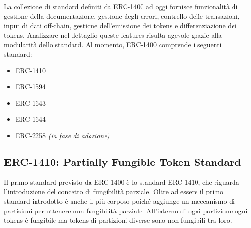 La collezione di standard definiti da ERC-1400 ad oggi fornisce funzionalità di gestione della documentazione, gestione degli errori, controllo delle transazioni, input di dati off-chain, gestione dell'emissione dei tokens e differenziazione dei tokens. 
Analizzare nel dettaglio queste features risulta agevole grazie alla modularità dello standard. Al momento, ERC-1400 comprende i seguenti standard:
\begin{itemize}
    \item ERC-1410
    \item ERC-1594
    \item ERC-1643
    \item ERC-1644
    \item ERC-2258 \textit{(in fase di adozione)}
\end{itemize}

\subsection{ERC-1410: Partially Fungible Token Standard}
Il primo standard previsto da ERC-1400 è lo standard ERC-1410, che riguarda l'introduzione del concetto di fungibilità parziale. Oltre ad essere il primo standard introdotto è anche il più corposo poiché aggiunge un meccanismo di partizioni per ottenere non fungibilità parziale. All'interno di ogni partizione ogni tokens è fungibile ma tokens di partizioni diverse sono non fungibili tra loro.   


